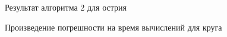 \documentclass[a4paper, 12pt]{article}
\begin{document}
\begin{figure}[h!]
  \caption{Результат алгоритма 2 для острия}
  \label{s4}
\end{figure}

\begin{figure}[h!]
  \caption{Произведение погрешности на время вычислений для круга}
  \label{s5}
\end{figure}
\end{document}
